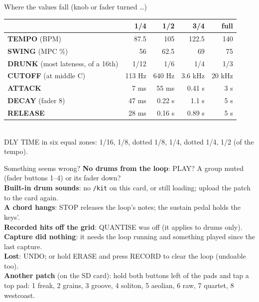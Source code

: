 \documentclass{article}
\newcommand{\GV}[1]{\textcolor{gvc}{#1}}
\newcommand{\CH}[1]{\textcolor{chc}{#1}}
\begin{document}
\begin{minipage}[t]{128mm}\vspace{0pt}
\begin{card}{Where the values fall (knob or fader turned \dots)}
\fontsize{7.4}{9}\selectfont
\setlength{\tabcolsep}{3pt}
\begin{tabular}{@{}l r r r r@{}}
 & 1/4 & 1/2 & 3/4 & full \\ \hline
\GV{\textbf{TEMPO}} (BPM) & 87.5 & 105 & 122.5 & 140 \\
\GV{\textbf{SWING}} (MPC \%) & 56 & 62.5 & 69 & 75 \\
\GV{\textbf{DRUNK}} (most lateness, of a 16th) & 1/12 & 1/6 & 1/4 & 1/3 \\
\textcolor{fltc}{\textbf{CUTOFF}} (at middle C) & 113 Hz & 640 Hz & 3.6 kHz & 20 kHz \\
\CH{\textbf{ATTACK}} & 7 ms & 55 ms & 0.41 s & 3 s \\
\CH{\textbf{DECAY}} (fader 8) & 47 ms & 0.22 s & 1.1 s & 5 s \\
\CH{\textbf{RELEASE}} & 28 ms & 0.16 s & 0.89 s & 5 s \\
\end{tabular}\\[0.5mm]
\GV{DLY TIME} in six equal zones: 1/16, 1/8, dotted 1/8, 1/4, dotted 1/4, 1/2 (of the tempo).
\end{card}

\begin{card}{Something seems wrong?}
\fontsize{7.4}{9}\selectfont
\textbf{No drums from the loop}: PLAY? A group muted (fader buttons 1--4) or its fader down?\\[0.3mm]
\textbf{Built-in drum sounds}: no \texttt{/kit} on this card, or still loading; upload the patch to the card again.\\[0.3mm]
\textbf{A chord hangs}: STOP releases the loop's notes; the sustain pedal holds the keys'.\\[0.3mm]
\textbf{Recorded hits off the grid}: QUANTISE was off (it applies to drums only).\\[0.3mm]
\textbf{Capture did nothing}: it needs the loop running and something played since the last capture.\\[0.3mm]
\textbf{Lost}: UNDO; or hold ERASE and press RECORD to clear the loop (undoable too).\\[0.3mm]
\textbf{Another patch} (on the SD card): hold both buttons left of the pads and tap a top pad: 1 freak, 2 grains, 3 groove, 4 soliton, 5 aeolian, 6 raw, 7 quartet, 8 westcoast.
\end{card}


\end{minipage}
\end{document}
